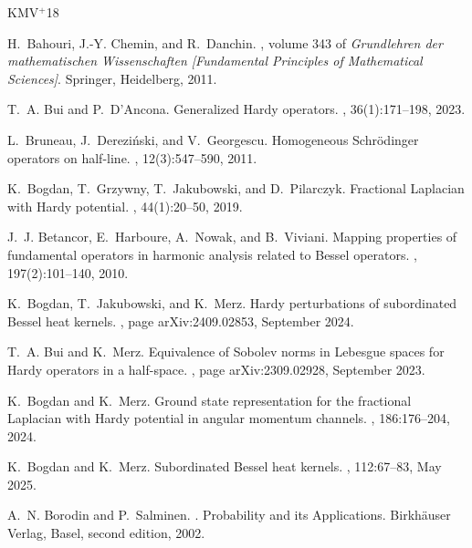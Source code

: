 \documentclass[12pt,reqno]{amsart}
\theoremstyle{definition}
\theoremstyle{remark}
\numberwithin{equation}{section}
\newcommand{\1}{\mathbbm{1}}
\begin{document}
\newcommand{\etalchar}[1]{$^{#1}$}
\def\cprime{$'$}
\begin{thebibliography}{KMV{\etalchar{+}}18}

H.~Bahouri, J.-Y. Chemin, and R.~Danchin.
,
  volume 343 of {\em Grundlehren der mathematischen Wissenschaften [Fundamental
  Principles of Mathematical Sciences]}.
\newblock Springer, Heidelberg, 2011.

T.~A. Bui and P.~D'Ancona.
\newblock Generalized {H}ardy operators.
, 36(1):171--198, 2023.

L.~Bruneau, J.~Derezi\'{n}ski, and V.~Georgescu.
\newblock Homogeneous {S}chr\"{o}dinger operators on half-line.
, 12(3):547--590, 2011.

K.~Bogdan, T.~Grzywny, T.~Jakubowski, and D.~Pilarczyk.
\newblock Fractional {L}aplacian with {H}ardy potential.
, 44(1):20--50, 2019.

J.~J. Betancor, E.~Harboure, A.~Nowak, and B.~Viviani.
\newblock Mapping properties of fundamental operators in harmonic analysis
  related to {B}essel operators.
, 197(2):101--140, 2010.

K.~{Bogdan}, T.~{Jakubowski}, and K.~{Merz}.
\newblock Hardy perturbations of subordinated {B}essel heat kernels.
, page arXiv:2409.02853, September 2024.

T.~A. {Bui} and K.~{Merz}.
\newblock Equivalence of {S}obolev norms in {L}ebesgue spaces for {H}ardy
  operators in a half-space.
, page arXiv:2309.02928, September 2023.

K.~Bogdan and K.~Merz.
\newblock Ground state representation for the fractional {L}aplacian with
  {H}ardy potential in angular momentum channels.
, 186:176--204, 2024.

K.~{Bogdan} and K.~{Merz}.
\newblock Subordinated {B}essel heat kernels.
, 112:67--83, May 2025.

A.~N. Borodin and P.~Salminen.
.
\newblock Probability and its Applications. Birkh\"{a}user Verlag, Basel,
  second edition, 2002.


\end{thebibliography}
\end{document}
